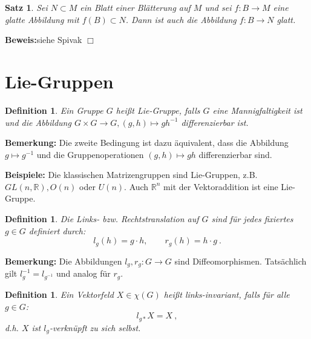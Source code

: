 \documentclass[12pt,a4paper]{article}
\def\R{\mathbb{R}}
\newtheorem{Satz}[Lemma]{Satz}
\newtheorem{Definition}[Lemma]{Definition}
\def\proof{\noindent\textbf{Beweis:}\quad}
\def\qed{\quad\hfill\ensuremath{\Box}}
\begin{document}
\bigskip

\begin{Satz}
Sei $N\subset M$ ein Blatt einer Bl\"atterung auf $M$ und sei $f: B \rightarrow M$ eine glatte
Abbildung mit $f(B) \subset N$. Dann ist auch die  Abbildung $f:B \rightarrow N$ glatt.
\end{Satz}
\proof siehe Spivak \qed


\section{Lie-Gruppen}

\begin{Definition}
Ein Gruppe $G$ hei\ss t {\em Lie-Gruppe}, falls $G$ eine Mannigfaltigkeit ist und die Abbildung
$G\times G \rightarrow G, (g,h)\mapsto gh^{-1}$ differenzierbar ist.
\end{Definition}

{\bf Bemerkung:} Die zweite Bedingung ist dazu \"aquivalent, dass die Abbildung $g\mapsto g^{-1}$
und die Gruppenoperationen $(g,h)\mapsto gh$ differenzierbar sind.

\bigskip

{\bf Beispiele:} Die klassischen Matrizengruppen sind Lie-Gruppen, z.B. $GL(n,\R), O(n)$ oder
$U(n)$. Auch $\R^n$ mit der Vektoraddition ist eine Lie-Gruppe.

\bigskip

\begin{Definition}
Die {\em Links-} bzw. {\em Rechtstranslation} auf $G$ sind f\"ur jedes fixiertes $g\in G$
definiert durch:
$$
l_g(h) = g\cdot h,\qquad r_g(h) = h\cdot g \ .
$$
\end{Definition}


{\bf Bemerkung:} Die Abbildungen $l_g, r_g : G\rightarrow G$ sind Diffeomorphismen. Tats\"achlich
gilt $l_g^{-1} = l_{g^{-1}}$ und analog f\"ur $r_g$.

\begin{Definition}
Ein Vektorfeld $X\in \chi(G)$ hei\ss t {\em links-invariant}, falls f\"ur alle $g\in G$:
$$
l_{g*} X = X \ ,
$$
d.h. $X$ ist $l_g$-verkn\"upft zu sich selbst.
\end{Definition}

\bigskip
\end{document}
